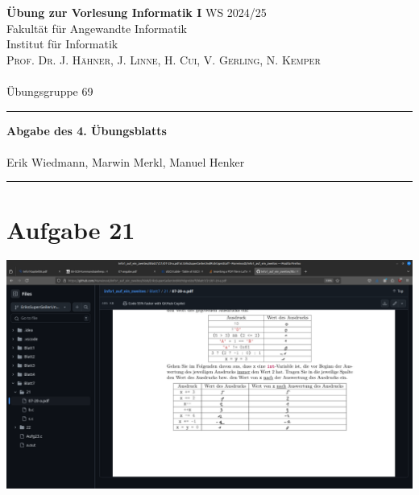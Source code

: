 \documentclass[paper=a4, %
         fontsize=10pt,  %
         oneside,        %
         headsepline,    %
         notitlepage     %
]{scrartcl}              %
\newcommand{\ownline}{\vspace{.7em}\hrule\vspace{.7em}}
\newcommand{\aufgabe}[1]{\section*{Aufgabe #1}}
\begin{document}
\textbf{Übung zur Vorlesung Informatik I} \hfill{WS 2024/25} \\  
Fakultät für Angewandte Informatik \\
Institut für Informatik \\
\textsc{Prof. Dr. J. Hähner, J. Linne, H. Cui, V. Gerling, N. Kemper} \\
\mbox{} \\
{\large Übungsgruppe 69} %
\ownline
\begin{center}
	{\LARGE \textbf{Abgabe des 4. Übungsblatts}} \\ %
	\mbox{} \\
	{\large Erik Wiedmann, Marwin Merkl, Manuel Henker} \\ %
\end{center}
\ownline



\aufgabe{21}
\includegraphics{21_a.png}

\end{document}
